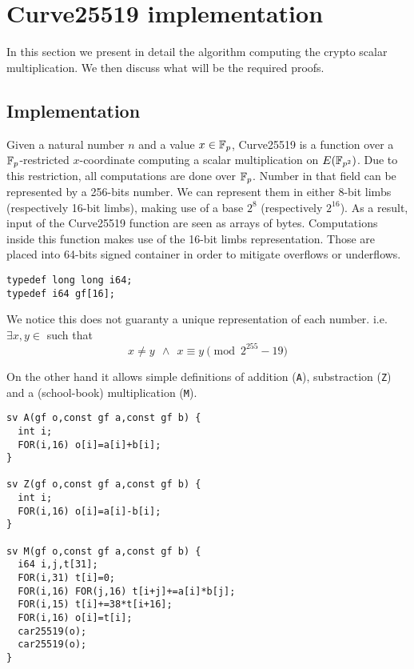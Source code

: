 \section{Curve25519 implementation}

In this section we present in detail the algorithm computing the crypto scalar multiplication.
We then discuss what will be the required proofs.

\subsection{Implementation} \label{sec:impl}

Given a natural number $n$ and a value $x \in \mathbb{F}_{p}$, Curve25519 is a function over a $\mathbb{F}_{p}$-restricted
$x$-coordinate computing a scalar multiplication on $E(\mathbb{F}_{p^2})$.
Due to this restriction, all computations are done over $\mathbb{F}_{p}$.
Number in that field can be represented by a 256-bits number.
We can represent them in either 8-bit limbs (respectively 16-bit limbs),
making use of a base $2^8$ (respectively $2^{16}$).
As a result, input of the Curve25519 function are seen as arrays of bytes.
Computations inside this function makes use of the 16-bit limbs representation.
Those are placed into 64-bits signed container in order to mitigate overflows or underflows.

\begin{lstlisting}[language=Ctweetnacl]
typedef long long i64;
typedef i64 gf[16];
\end{lstlisting}
We notice this does not guaranty a unique representation of each number. i.e.\\
$\exists x,y \in$  such that
\vspace{-0.25cm}
  $$x \neq y\ \ \land\ \ x \equiv y \pmod{2^{255}-19}$$

On the other hand it allows simple definitions of addition (\texttt{A}),
substraction (\texttt{Z}) and a (school-book) multiplication (\texttt{M}).
\begin{lstlisting}[language=Ctweetnacl]
sv A(gf o,const gf a,const gf b) {
  int i;
  FOR(i,16) o[i]=a[i]+b[i];
}

sv Z(gf o,const gf a,const gf b) {
  int i;
  FOR(i,16) o[i]=a[i]-b[i];
}

sv M(gf o,const gf a,const gf b) {
  i64 i,j,t[31];
  FOR(i,31) t[i]=0;
  FOR(i,16) FOR(j,16) t[i+j]+=a[i]*b[j];
  FOR(i,15) t[i]+=38*t[i+16];
  FOR(i,16) o[i]=t[i];
  car25519(o);
  car25519(o);
}
\end{lstlisting}


